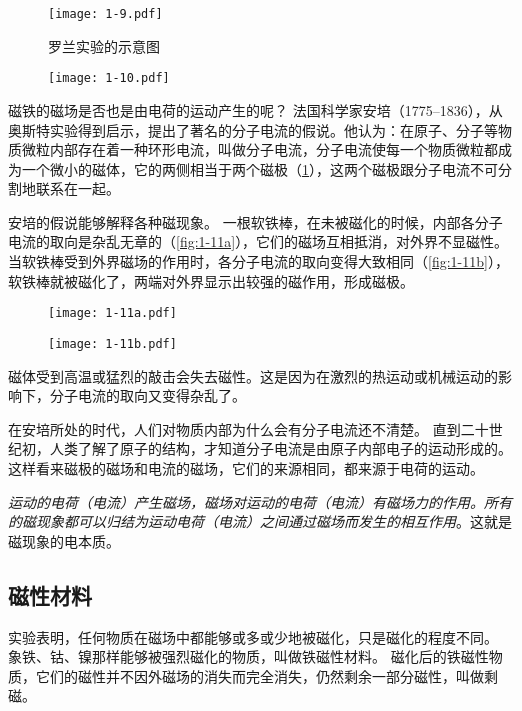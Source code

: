 \begin{figure}
	\begin{minipage}[b]{0.48\linewidth}
		\centering
    \texttt{[image: 1-9.pdf]}
		\caption{罗兰实验的示意图}\label{fig:1-9}
	\end{minipage}
	\begin{minipage}[b]{0.48\linewidth}
		\centering
		\texttt{[image: 1-10.pdf]}
		\caption{}\label{fig:1-10}
	\end{minipage}
\end{figure}


磁铁的磁场是否也是由电荷的运动产生的呢？
法国科学家安培（1775--1836），从奥斯特实验得到启示，提出了著名的分子电流的假说。他认为：在原子、分子等物质微粒内部存在着一种环形电流，叫做分子电流，分子电流使每一个物质微粒都成为一个微小的磁体，它的两侧相当于两个磁极（\cref{fig:1-10}），这两个磁极跟分子电流不可分割地联系在一起。

安培的假说能够解释各种磁现象。
一根软铁棒，在未被磁化的时候，内部各分子电流的取向是杂乱无章的（\cref{fig:1-11a}），它们的磁场互相抵消，对外界不显磁性。
当软铁棒受到外界磁场的作用时，各分子电流的取向变得大致相同（\cref{fig:1-11b}），软铁棒就被磁化了，两端对外界显示出较强的磁作用，形成磁极。

\begin{figure}
  \begin{minipage}{0.45\linewidth}\centering
    \texttt{[image: 1-11a.pdf]}
    \subcaption{}\label{fig:1-11a}
  \end{minipage}
  \begin{minipage}{0.45\linewidth}\centering
    \texttt{[image: 1-11b.pdf]}
    \subcaption{}\label{fig:1-11b}
  \end{minipage}
  \caption{}\label{fig:1-11}
\end{figure}

磁体受到高温或猛烈的敲击会失去磁性。这是因为在激烈的热运动或机械运动的影响下，分子电流的取向又变得杂乱了。

在安培所处的时代，人们对物质内部为什么会有分子电流还不清楚。
直到二十世纪初，人类了解了原子的结构，才知道分子电流是由原子内部电子的运动形成的。
这样看来磁极的磁场和电流的磁场，它们的来源相同，都来源于电荷的运动。

\emph{运动的电荷（电流）产生磁场，磁场对运动的电荷（电流）有磁场力的作用。所有的磁现象都可以归结为运动电荷（电流）之间通过磁场而发生的相互作用}。这就是磁现象的电本质。

\subsection{磁性材料}
实验表明，任何物质在磁场中都能够或多或少地被磁化，只是磁化的程度不同。
象铁、钴、镍那样能够被强烈磁化的物质，叫做铁磁性材料。
磁化后的铁磁性物质，它们的磁性并不因外磁场的消失而完全消失，仍然剩余一部分磁性，叫做剩磁。

